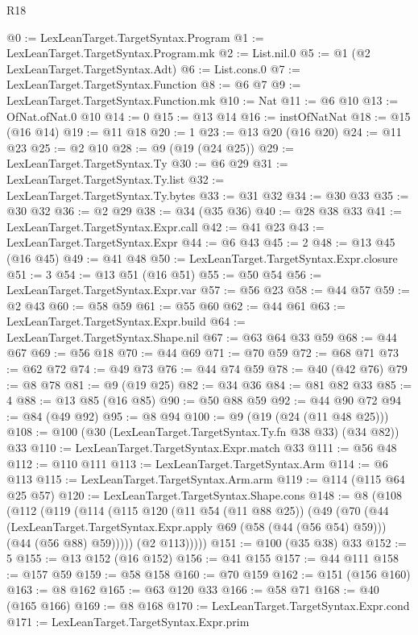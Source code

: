 \begin{lexlean}{R18}
\begin{coremodule}
@0 := LexLeanTarget.TargetSyntax.Program
@1 := LexLeanTarget.TargetSyntax.Program.mk
@2 := List.nil.{0}
@5 := @1 (@2 LexLeanTarget.TargetSyntax.Adt)
@6 := List.cons.{0}
@7 := LexLeanTarget.TargetSyntax.Function
@8 := @6 @7
@9 := LexLeanTarget.TargetSyntax.Function.mk
@10 := Nat
@11 := @6 @10
@13 := OfNat.ofNat.{0} @10
@14 := 0
@15 := @13 @14
@16 := instOfNatNat
@18 := @15 (@16 @14)
@19 := @11 @18
@20 := 1
@23 := @13 @20 (@16 @20)
@24 := @11 @23
@25 := @2 @10
@28 := @9 (@19 (@24 @25))
@29 := LexLeanTarget.TargetSyntax.Ty
@30 := @6 @29
@31 := LexLeanTarget.TargetSyntax.Ty.list
@32 := LexLeanTarget.TargetSyntax.Ty.bytes
@33 := @31 @32
@34 := @30 @33
@35 := @30 @32
@36 := @2 @29
@38 := @34 (@35 @36)
@40 := @28 @38 @33
@41 := LexLeanTarget.TargetSyntax.Expr.call
@42 := @41 @23
@43 := LexLeanTarget.TargetSyntax.Expr
@44 := @6 @43
@45 := 2
@48 := @13 @45 (@16 @45)
@49 := @41 @48
@50 := LexLeanTarget.TargetSyntax.Expr.closure
@51 := 3
@54 := @13 @51 (@16 @51)
@55 := @50 @54
@56 := LexLeanTarget.TargetSyntax.Expr.var
@57 := @56 @23
@58 := @44 @57
@59 := @2 @43
@60 := @58 @59
@61 := @55 @60
@62 := @44 @61
@63 := LexLeanTarget.TargetSyntax.Expr.build
@64 := LexLeanTarget.TargetSyntax.Shape.nil
@67 := @63 @64 @33 @59
@68 := @44 @67
@69 := @56 @18
@70 := @44 @69
@71 := @70 @59
@72 := @68 @71
@73 := @62 @72
@74 := @49 @73
@76 := @44 @74 @59
@78 := @40 (@42 @76)
@79 := @8 @78
@81 := @9 (@19 @25)
@82 := @34 @36
@84 := @81 @82 @33
@85 := 4
@88 := @13 @85 (@16 @85)
@90 := @50 @88 @59
@92 := @44 @90 @72
@94 := @84 (@49 @92)
@95 := @8 @94
@100 := @9 (@19 (@24 (@11 @48 @25)))
@108 := @100 (@30 (LexLeanTarget.TargetSyntax.Ty.fn @38 @33) (@34 @82)) @33
@110 := LexLeanTarget.TargetSyntax.Expr.match @33
@111 := @56 @48
@112 := @110 @111
@113 := LexLeanTarget.TargetSyntax.Arm
@114 := @6 @113
@115 := LexLeanTarget.TargetSyntax.Arm.arm
@119 := @114 (@115 @64 @25 @57)
@120 := LexLeanTarget.TargetSyntax.Shape.cons
@148 := @8
    (@108
      (@112
        (@119
          (@114
            (@115
              @120
              (@11 @54 (@11 @88 @25))
              (@49
                (@70
                  (@44
                    (LexLeanTarget.TargetSyntax.Expr.apply @69 (@58 (@44 (@56 @54) @59)))
                    (@44 (@56 @88) @59)))))
            (@2 @113)))))
@151 := @100 (@35 @38) @33
@152 := 5
@155 := @13 @152 (@16 @152)
@156 := @41 @155
@157 := @44 @111
@158 := @157 @59
@159 := @58 @158
@160 := @70 @159
@162 := @151 (@156 @160)
@163 := @8 @162
@165 := @63 @120 @33
@166 := @58 @71
@168 := @40 (@165 @166)
@169 := @8 @168
@170 := LexLeanTarget.TargetSyntax.Expr.cond
@171 := LexLeanTarget.TargetSyntax.Expr.prim

\end{coremodule}
\end{lexlean}
